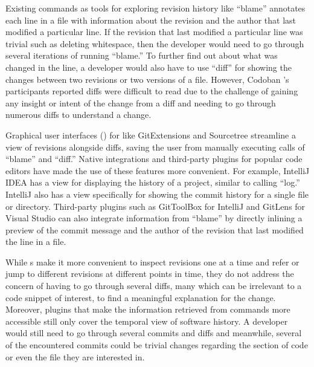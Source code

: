 Existing  commands as tools for exploring revision history like ``blame'' \cite{gitblame} annotates each line in a file with information about the revision and the author that last modified a particular line.
If the revision that last modified a particular line was trivial such as deleting whitespace, then the developer would need to go through several iterations of running ``blame.''
To further find out about what was changed in the line, a developer would also have to use  ``diff'' \cite{gitdiff} for showing the changes between two revisions or two versions of a file.
However, Codoban \etal's participants reported diffs were difficult to read due to the challenge of gaining any insight or intent of the change from a diff and needing to go through numerous diffs to understand a change. \cite{codoban_software_2015}

Graphical user interfaces () for  like GitExtensions \cite{gitextensions} and Sourcetree \cite{sourcetree} streamline a view of revisions alongside diffs, saving the user from manually executing calls of  ``blame'' and ``diff.'' 
Native  integrations and third-party plugins for popular code editors have made the use of these  features more convenient. 
For example, IntelliJ IDEA \cite{intellij} has a view for displaying the  history of a project, similar to calling  ``log.''
IntelliJ also has a view specifically for showing the commit history for a single file or directory. \cite{intellij-showhistory}
Third-party plugins such as GitToolBox for IntelliJ and GitLens for Visual Studio can also integrate information from  ``blame'' by directly inlining a preview of the commit message and the author of the revision that last modified the line in a file.

While s make it more convenient to inspect revisions one at a time and refer or jump to different revisions at different points in time, they do not address the concern of having to go through several diffs, many which can be irrelevant to a code snippet of interest, to find a meaningful explanation for the change.
Moreover, plugins that make the information retrieved from  commands more accessible still only cover the temporal view of software history.
A developer would still need to go through several commits and diffs and meanwhile, several of the encountered commits could be trivial changes regarding the section of code or even the file they are interested in.

